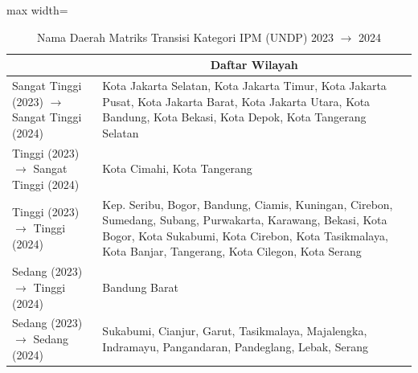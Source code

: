 \begin{table}[H]
\centering
\caption{Nama Daerah Matriks Transisi Kategori IPM (UNDP) 2023 \(\rightarrow\) 2024} \label{tab:app2ipmname2023x2024}
\begin{adjustbox}{max width=\textwidth}
\begin{tabular}{|>{\centering\arraybackslash}p{4cm}|p{10cm}|}
\hline
\multicolumn{1}{|c|}{\textbf{Kategori}} & \multicolumn{1}{c|}{\textbf{Daftar Wilayah}} \\
\hline
Sangat Tinggi (2023) \(\rightarrow\) Sangat Tinggi (2024) & Kota Jakarta Selatan, Kota Jakarta Timur, Kota Jakarta Pusat, Kota Jakarta Barat, Kota Jakarta Utara, Kota Bandung, Kota Bekasi, Kota Depok, Kota Tangerang Selatan \\
\hline
Tinggi (2023) \(\rightarrow\) Sangat Tinggi (2024) & Kota Cimahi, Kota Tangerang \\
\hline
Tinggi (2023) \(\rightarrow\) Tinggi (2024) & Kep. Seribu, Bogor, Bandung, Ciamis, Kuningan, Cirebon, Sumedang, Subang, Purwakarta, Karawang, Bekasi, Kota Bogor, Kota Sukabumi, Kota Cirebon, Kota Tasikmalaya, Kota Banjar, Tangerang, Kota Cilegon, Kota Serang \\
\hline
Sedang (2023) \(\rightarrow\) Tinggi (2024) & Bandung Barat \\
\hline
Sedang (2023) \(\rightarrow\) Sedang (2024) & Sukabumi, Cianjur, Garut, Tasikmalaya, Majalengka, Indramayu, Pangandaran, Pandeglang, Lebak, Serang \\
\hline
\end{tabular}
\end{adjustbox}
\end{table}